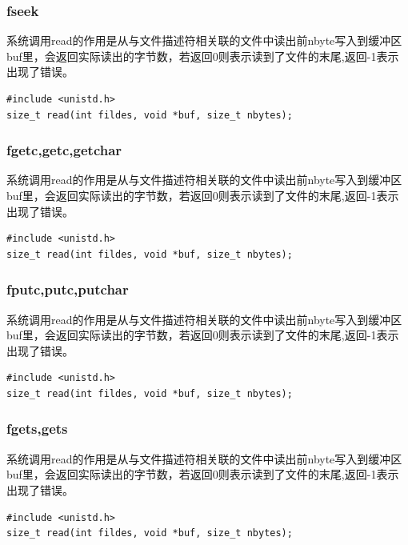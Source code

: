 \documentclass{beamer}
\begin{document}
\begin{frame}[fragile]
\frametitle{fseek}
系统调用read的作用是从与文件描述符相关联的文件中读出前nbyte写入到缓冲区buf里，会返回实际读出的字节数，若返回0则表示读到了文件的末尾,返回-1表示出现了错误。
\begin{example}[read系统调用的原型]
\begin{verbatim}
#include <unistd.h>
size_t read(int fildes, void *buf, size_t nbytes);
\end{verbatim}
\end{example}

\end{frame}
\begin{frame}[fragile]
\frametitle{fgetc,getc,getchar}
系统调用read的作用是从与文件描述符相关联的文件中读出前nbyte写入到缓冲区buf里，会返回实际读出的字节数，若返回0则表示读到了文件的末尾,返回-1表示出现了错误。
\begin{example}[read系统调用的原型]
\begin{verbatim}
#include <unistd.h>
size_t read(int fildes, void *buf, size_t nbytes);
\end{verbatim}
\end{example}

\end{frame}
\begin{frame}[fragile]
\frametitle{fputc,putc,putchar}
系统调用read的作用是从与文件描述符相关联的文件中读出前nbyte写入到缓冲区buf里，会返回实际读出的字节数，若返回0则表示读到了文件的末尾,返回-1表示出现了错误。
\begin{example}[read系统调用的原型]
\begin{verbatim}
#include <unistd.h>
size_t read(int fildes, void *buf, size_t nbytes);
\end{verbatim}
\end{example}

\end{frame}
\begin{frame}[fragile]
\frametitle{fgets,gets}
系统调用read的作用是从与文件描述符相关联的文件中读出前nbyte写入到缓冲区buf里，会返回实际读出的字节数，若返回0则表示读到了文件的末尾,返回-1表示出现了错误。
\begin{example}[read系统调用的原型]
\begin{verbatim}
#include <unistd.h>
size_t read(int fildes, void *buf, size_t nbytes);
\end{verbatim}
\end{example}

\end{frame}
\end{document}
